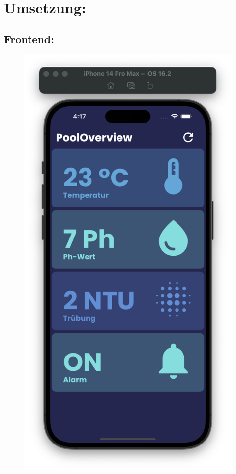 \section{Umsetzung:}
\subsection*{Frontend:}
\begin{figure}[h!]
    \begin{minipage}[c]{0.5\textwidth}
      \includegraphics[width=\textwidth]{./pics/StartpageBild.png}

\end{minipage}
\end{figure}
